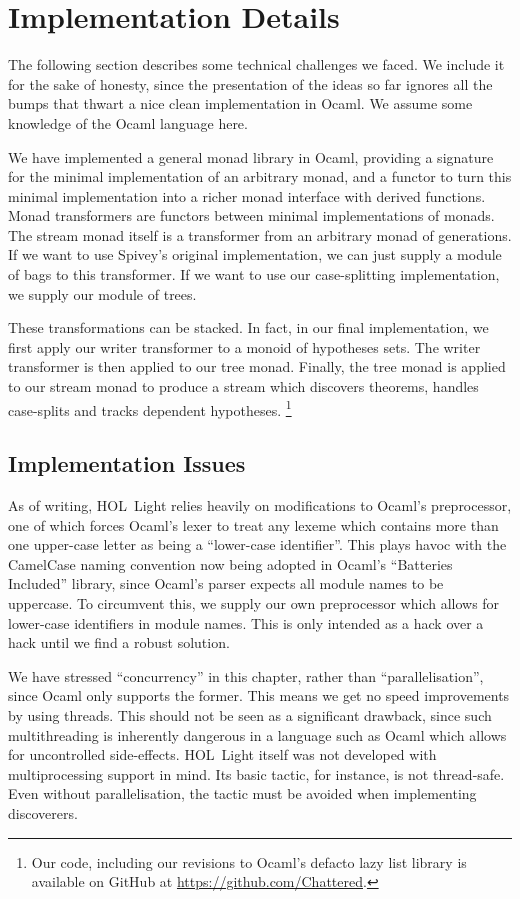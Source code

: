 \section{Implementation Details}
The following section describes some technical challenges we faced. We include it for the sake of honesty, since the presentation of the ideas so far ignores all the bumps that thwart a nice clean implementation in Ocaml. We assume some knowledge of the Ocaml language here.

We have implemented a general monad library in Ocaml, providing a signature for the minimal implementation of an arbitrary monad, and a functor to turn this minimal implementation into a richer monad interface with derived functions. Monad transformers are functors between minimal implementations of monads. The stream monad itself is a transformer from an arbitrary monad of generations. If we want to use Spivey's original implementation, we can just supply a module of bags to this transformer. If we want to use our case-splitting implementation, we supply our module of trees. 

These transformations can be stacked. In fact, in our final implementation, we first apply our writer transformer to a monoid of hypotheses sets. The writer transformer is then applied to our tree monad. Finally, the tree monad is applied to our stream monad to produce a stream which discovers theorems, handles case-splits and tracks dependent hypotheses. \footnote{Our code, including our revisions to Ocaml's defacto lazy list library is available on GitHub at \url{https://github.com/Chattered}.}

\subsection{Implementation Issues}
As of writing, HOL~Light relies heavily on modifications to Ocaml's preprocessor, one of which forces Ocaml's lexer to treat any lexeme which contains more than one upper-case letter as being a ``lower-case identifier''. This plays havoc with the CamelCase naming convention now being adopted in Ocaml's ``Batteries Included'' library, since Ocaml's parser expects all module names to be uppercase. To circumvent this, we supply our own preprocessor which allows for lower-case identifiers in module names. This is only intended as a hack over a hack until we find a robust solution.

We have stressed ``concurrency'' in this chapter, rather than ``parallelisation'', since Ocaml only supports the former. This means we get no speed improvements by using threads. This should not be seen as a significant drawback, since such multithreading is inherently dangerous in a language such as Ocaml which allows for uncontrolled side-effects. HOL~Light itself was not developed with multiprocessing support in mind. Its basic  tactic, for instance, is not thread-safe. Even without parallelisation, the tactic must be avoided when implementing discoverers.


